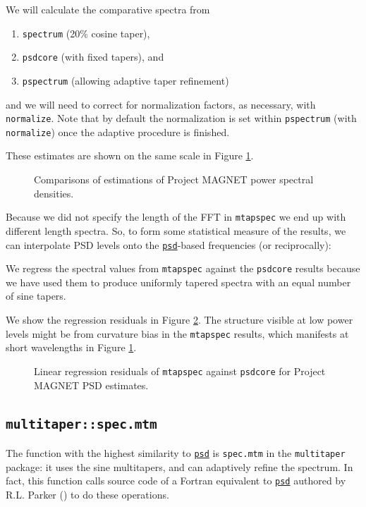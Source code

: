\documentclass[10pt]{article}\usepackage[]{graphicx}\usepackage[]{color}
\newcommand{\Rcmd}[1]{\texttt{#1}}
\newcommand{\psd}[0]{\href{http://www.github.com/abarbour/psd/}{\color{blue}\Rcmd{psd}}}
\begin{document}
We will calculate the comparative spectra
from
\begin{enumerate}
  \item \Rcmd{spectrum} (20\% cosine taper),
  \item \Rcmd{psdcore} (with fixed tapers), and
  \item \Rcmd{pspectrum} (allowing adaptive taper refinement)
\end{enumerate}
and we will need to correct for normalization factors, as necessary, with
\Rcmd{normalize}. Note that by default the normalization is
set within \Rcmd{pspectrum} (with \Rcmd{normalize}) once the adaptive procedure
is finished.


These estimates are shown on the same scale in
Figure \ref{fig:psdcomp}.

\begin{figure}[!htbp]
\begin{center}

\caption{Comparisons of estimations of Project MAGNET power spectral densities.}
\label{fig:psdcomp}
\end{center}
\end{figure}

Because we did not specify the length of the FFT in \Rcmd{mtapspec}
we end up with different length spectra.  So, to form some statistical measure
of the results, we can interpolate PSD levels onto the \psd{}-based frequencies
(or reciprocally): 

We regress the spectral values from \Rcmd{mtapspec} against
the \Rcmd{psdcore} results because we have used them to
produce uniformly tapered spectra
with an equal number of sine tapers.

We show the regression residuals in Figure \ref{fig:psdreg}.  
The structure visible
at low power levels might be from curvature bias in
the \Rcmd{mtapspec} results, which
manifests at short wavelengths
in Figure \ref{fig:psdcomp}.

\begin{figure}[!htbp]
\begin{center}

\caption{Linear regression residuals of
\Rcmd{mtapspec} against \Rcmd{psdcore} for Project MAGNET PSD estimates.}
\label{fig:psdreg}
\end{center}
\end{figure}

\subsection{\Rcmd{multitaper::spec.mtm}}
The function with the highest similarity to \psd{} is
\Rcmd{spec.mtm} in the \Rcmd{multitaper} package: it uses
the sine multitapers, and can adaptively refine the spectrum.
In fact, this function
calls source code of a Fortran equivalent to \psd{}
authored by R.L. Parker (\citeyear{parkerweb}) to do these operations.
\end{document}
